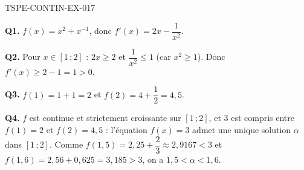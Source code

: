 \begin{corrige}{TSPE-CONTIN-EX-017}

\textbf{Q1.} $f(x) = x^2 + x^{-1}$, donc $f'(x) = 2x - \dfrac{1}{x^2}$.

\textbf{Q2.} Pour $x \in [1\,;2]$ : $2x \geq 2$ et $\dfrac{1}{x^2} \leq 1$ (car $x^2 \geq 1$). Donc $f'(x) \geq 2 - 1 = 1 > 0$.

\textbf{Q3.} $f(1) = 1 + 1 = 2$ et $f(2) = 4 + \dfrac{1}{2} = 4{,}5$.

\textbf{Q4.} $f$ est continue et strictement croissante sur $[1\,;2]$, et $3$ est compris entre $f(1) = 2$ et $f(2) = 4{,}5$ : l'équation $f(x) = 3$ admet une unique solution $\alpha$ dans $[1\,;2]$. Comme $f(1{,}5) = 2{,}25 + \dfrac{2}{3} \approx 2{,}9167 < 3$ et $f(1{,}6) = 2{,}56 + 0{,}625 = 3{,}185 > 3$, on a $1{,}5 < \alpha < 1{,}6$.
\end{corrige}
